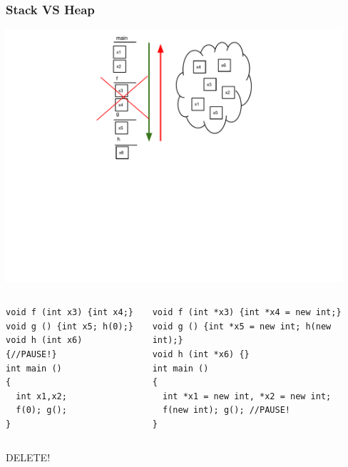 \documentclass{beamer}
\begin{document}
\begin{frame}[fragile]
\frametitle{Stack VS Heap}

\vspace{-10px}
\includegraphics[width=12.5cm]{images/stackVSheap}

\vspace{-150px}


\begin{columns}[t]
  \begin{column}{0.5\textwidth}

\begin{flushleft}
\begin{lstlisting}
void f (int x3) {int x4;}
void g () {int x5; h(0);}
void h (int x6) {//PAUSE!}
int main ()
{
  int x1,x2;
  f(0); g();
}
\end{lstlisting}  
\end{flushleft}
  \end{column}
  \begin{column}{0.5\textwidth}
\begin{flushleft}
\begin{lstlisting}
void f (int *x3) {int *x4 = new int;}
void g () {int *x5 = new int; h(new int);}
void h (int *x6) {}
int main ()
{
  int *x1 = new int, *x2 = new int;
  f(new int); g(); //PAUSE!
}
\end{lstlisting}  
\end{flushleft}
  \end{column}
\end{columns}


\end{frame}

\begin{frame}
\centerline{DELETE!}
\end{frame}
\end{document}
